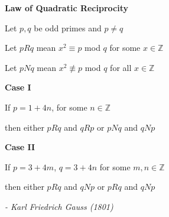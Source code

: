 \documentclass[17pt]{memoir}
\begin{document}
\Large

\begin{center}
  \textbf{Law of Quadratic Reciprocity}
\end{center}

Let $p, q$ be odd primes and $p \neq q$

Let $pRq$ mean $x^2 \equiv p$ mod $q$ for some $x \in \mathbb{Z}$

Let $pNq$ mean $x^2 \not\equiv p$ mod $q$ for all $x \in \mathbb{Z}$

\medskip
\textbf{Case I}

If $p = 1 + 4n$, for some $n \in \mathbb{Z}$

then either $pRq$ and $qRp$ or $pNq$ and $qNp$

\medskip
\textbf{Case II}

If $p = 3 + 4m$, $q = 3 + 4n$ for some $m,n \in \mathbb{Z}$

then either $pRq$ and $qNp$ or $pRq$ and $qNp$

\bigskip
\begin{flushright}
  \textit{- Karl Friedrich Gauss (1801)}
\end{flushright}
\end{document}
